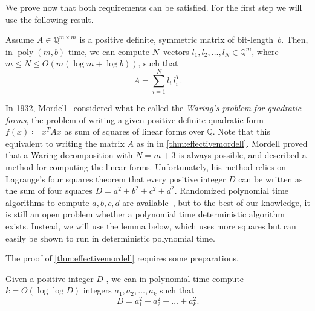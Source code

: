 \documentclass[a4paper,USenglish,cleveref,numberwithinsect]{lipics-v2021}
\DeclareMathOperator{\poly}{poly}
\newcommand{\QQ}{\mathbb{Q}}
\numberwithin{equation}{section}
\begin{document}
We prove now that both requirements can be satisfied.
For the first step we will use the following result.

\begin{theorem}\label{thm:effectivemordell}
Assume $A\in\QQ^{m\times m}$ is a positive definite, symmetric matrix of bit-length~$b$.
Then, in $\poly(m,b)$-time,
we can compute
$N$~vectors $l_1,l_2,\dots,l_N\in\QQ^m$, where $m\leq N\leq O(m(\log m + \log b))$,
such that
\begin{equation*}%
A = \sum_{i=1}^N l_i\, l_i^T.
\end{equation*}
\end{theorem}

\begin{remark}
In 1932, Mordell~\cite{mordell} considered what he called the \textit{Waring's problem for quadratic forms},
the problem of writing a given positive definite quadratic form $f(x)\coloneqq x^T Ax$ as sum of squares of linear forms over $\QQ$.
Note that this equivalent to writing the matrix $A$ as in in \cref{thm:effectivemordell}. %
Mordell proved that a Waring decomposition with $N=m+3$ is always possible,
and described a method for computing the linear forms.
Unfortunately, his method relies on Lagrange's four squares theorem
that every positive integer $D$ can be written as the sum of four squares $D=a^2+b^2+c^2+d^2$.
Randomized polynomial time algorithms to compute $a,b,c,d$ are available~\cite{rabin-shallit},
but to the best of our knowledge, it is still an open problem whether a polynomial time deterministic algorithm exists.
Instead, we will use the lemma below, %
which uses more squares but can easily be shown to run in deterministic polynomial time.
\end{remark}

The proof of \cref{thm:effectivemordell} requires some preparations.

\begin{lemma}
\label{lem:sos}
Given a positive integer $D$ ,
we can in polynomial time compute
$k= O(\log \log D)$ integers $a_1,a_2,\dots,a_k$ such that
\[
 D = a_1^2 + a_2^2 + \dots + a_k^2.
\]
\end{lemma}
\end{document}
